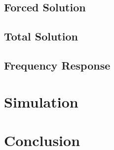 \documentclass[11pt]{article}
\begin{document}
%

\subsection{Forced Solution}

%

\subsection{Total Solution}

%

\subsection{Frequency Response}

%

\pagebreak
\section{Simulation}
%

\pagebreak
\section{Conclusion}
%
\end{document}
